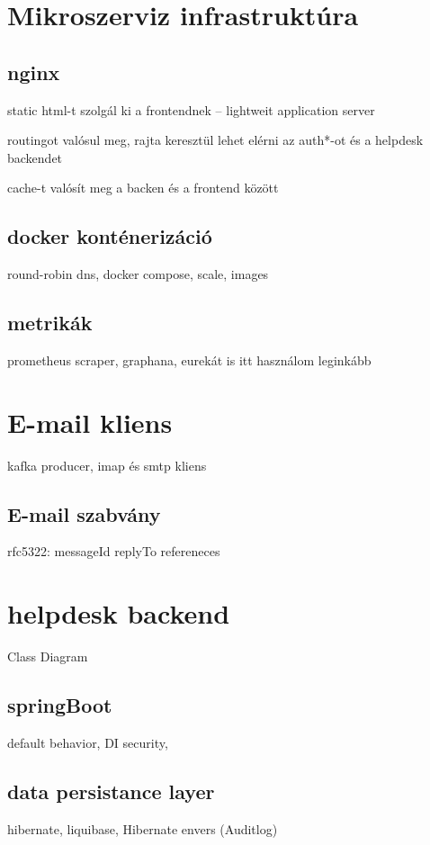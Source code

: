\section{Mikroszerviz infrastruktúra}
\subsection{nginx}
static html-t szolgál ki a frontendnek -- lightweit application server

routingot valósul meg, rajta keresztül lehet elérni az auth*-ot és a helpdesk backendet

cache-t valósít meg a backen és a frontend között

\subsection{docker konténerizáció}
round-robin dns, docker compose, scale, images

\subsection{metrikák}
prometheus scraper, graphana, eurekát is itt használom leginkább






\section{E-mail kliens}
kafka producer, imap és smtp kliens

\subsection{E-mail szabvány}
	rfc5322: 
	messageId
	replyTo
	refereneces







\section{helpdesk backend}
Class Diagram

\subsection{springBoot}
default behavior, DI
security, 	

\subsection{data persistance layer}
hibernate, liquibase, Hibernate envers (Auditlog)

